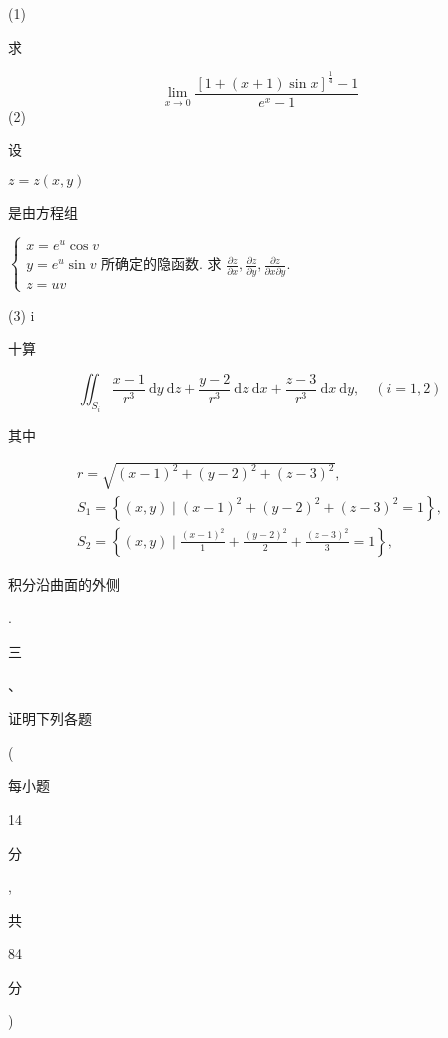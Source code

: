 \documentclass[10pt]{article}
\begin{document}
(1) \begin{CJK}{UTF8}{mj}求\end{CJK}
$$
\lim _{x \rightarrow 0} \frac{[1+(x+1) \sin x]^{\frac{1}{4}}-1}{e^{x}-1}
$$
(2) \begin{CJK}{UTF8}{mj}设\end{CJK} $z=z(x, y)$ \begin{CJK}{UTF8}{mj}是由方程组\end{CJK} $\left\{\begin{array}{l}x=e^{u} \cos v \\ y=e^{u} \sin v \text { 所确定的隐函数. 求 } \frac{\partial z}{\partial x}, \frac{\partial z}{\partial y}, \frac{\partial z}{\partial x \partial y} \text {. } \\ z=u v\end{array}\right.$

(3) i\begin{CJK}{UTF8}{mj}十算\end{CJK}
$$
\iint_{S_{i}} \frac{x-1}{r^{3}} \mathrm{~d} y \mathrm{~d} z+\frac{y-2}{r^{3}} \mathrm{~d} z \mathrm{~d} x+\frac{z-3}{r^{3}} \mathrm{~d} x \mathrm{~d} y, \quad(i=1,2)
$$
\begin{CJK}{UTF8}{mj}其中\end{CJK}
$$
\begin{gathered}
r=\sqrt{(x-1)^{2}+(y-2)^{2}+(z-3)^{2}}, \\
S_{1}=\left\{(x, y) \mid(x-1)^{2}+(y-2)^{2}+(z-3)^{2}=1\right\}, \\
S_{2}=\left\{(x, y) \mid \frac{(x-1)^{2}}{1}+\frac{(y-2)^{2}}{2}+\frac{(z-3)^{2}}{3}=1\right\},
\end{gathered}
$$
\begin{CJK}{UTF8}{mj}积分沿曲面的外侧\end{CJK}.

\begin{CJK}{UTF8}{mj}三\end{CJK}、\begin{CJK}{UTF8}{mj}证明下列各题\end{CJK} (\begin{CJK}{UTF8}{mj}每小题\end{CJK} 14 \begin{CJK}{UTF8}{mj}分\end{CJK}, \begin{CJK}{UTF8}{mj}共\end{CJK} 84 \begin{CJK}{UTF8}{mj}分\end{CJK})
\end{document}
